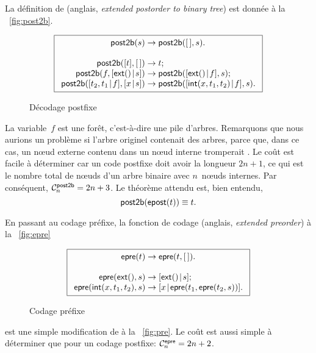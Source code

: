 La définition de 
(anglais, \emph{extended postorder to binary tree}) est donnée à la
\fig~\vref{fig:post2b}.
\begin{figure}
\begin{equation*}
\boxed{
\begin{array}{r@{\;}c@{\;}l}
\fun{post2b}(s) & \rightarrow & \fun{post2b}(\el,s).\\
\\
\fun{post2b}([t],\el) & \rightarrow & t;\\
\fun{post2b}(f,\cons{\fun{ext}()}{s}) & \rightarrow & \fun{post2b}(\cons{\fun{ext}()}{f},s);\\
\fun{post2b}(\cons{t_2,t_1}{f},\cons{x}{s}) & \rightarrow & \fun{post2b}(\cons{\fun{int}(x,t_1,t_2)}{f},s).
\end{array}}
\end{equation*}
\caption{Décodage postfixe}
\label{fig:post2b}
\end{figure}
La variable~\(f\) est une forêt, c'est-à-dire une
pile d'arbres. Remarquons que nous aurions un problème si l'arbre
originel contenait des arbres, parce que, dans ce cas, un nœud
externe contenu dans un nœud interne tromperait
. Le coût est facile à
déterminer car un code postfixe doit avoir la longueur \(2n+1\), ce
qui est le nombre total de nœuds d'un arbre binaire avec
\(n\)~nœuds internes. Par conséquent, \(\C{\fun{post2b}}{n} = 2n +
3\). Le théorème attendu est, bien
entendu,
\begin{equation}
\fun{post2b}(\fun{epost}(t)) \equiv t.
\label{thm_post2b_epost}
\end{equation}

En passant au codage préfixe, la fonction de codage
(anglais, \emph{extended preorder}) à la \fig~\vref{fig:epre}
\begin{figure}[b]
\begin{equation*}
\boxed{
\begin{array}{r@{\;}c@{\;}l}
\fun{epre}(t) & \rightarrow & \fun{epre}(t,\el).\\
\\
\fun{epre}(\fun{ext}(),s) & \rightarrow
  & \cons{\fun{ext}()}{s};\\
\fun{epre}(\fun{int}(x,t_1,t_2),s) & \rightarrow
  & \cons{x}{\fun{epre}(t_1,\fun{epre}(t_2,s))}.
\end{array}}
\end{equation*}
\caption{Codage préfixe}
\label{fig:epre}
\end{figure}
est une simple modification de  à la
\fig~\vref{fig:pre}. Le coût est aussi simple à déterminer que pour un
codage postfixe: \(\C{\fun{epre}}{n} =
2n+2\).

